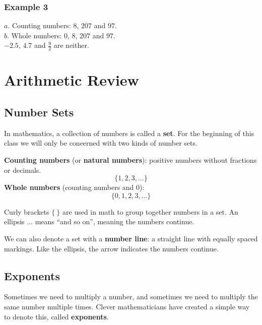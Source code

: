 \documentclass[letter]{article}
\newenvironment{keybox}
  {\begin{lrbox}{\keyboxsave}\begin{minipage}{\dimexpr\linewidth-2\fboxsep-2\fboxrule\relax}}
  {\end{minipage}\end{lrbox}\par\noindent\fbox{\usebox{\keyboxsave}}\par}
\newcommand{\chp}{}
\newcommand{\solsec}[1]{\phantomsection\label{sec:\chp ex#1}\subsubsection*{Example #1}}
\begin{document}
\solsec{3}
$a.$ Counting numbers: $8$, $207$ and $97$.\\
$b.$ Whole numbers: $0$, $8$, $207$ and $97$.\\
$-2.5$, $4.7$ and $\frac92$ are neither.
\clearpage
\def\chp{arith}
\lfoot{}
\section{Arithmetic Review}
\subsection{Number Sets}

In mathematics, a collection of numbers is called a \textbf{set}. For the beginning of this class we will only be concerned with two kinds of number sets.

\textbf{Counting numbers} (or \textbf{natural numbers}): positive numbers without fractions or decimals.
\[\{1,2,3,\ldots\}\]
\textbf{Whole numbers} (counting numbers and $0$):
\[\{0,1,2,3,\ldots\}\]

\begin{keybox}
Curly brackets $\{\ \}$ are used in math to group together numbers in a set. An ellipsis $\ldots$ means ``and so on'', meaning the numbers continue.
\end{keybox}

We can also denote a set with a \textbf{number line}: a straight line with equally spaced markings. Like the ellipsis, the arrow indicates the numbers continue.

\begin{center}
\end{center}

\subsection{Exponents}

Sometimes we need to multiply a number, and sometimes we need to multiply the same number multiple times. Clever mathematicians have created a simple way to denote this, called \textbf{exponents}.
\end{document}
